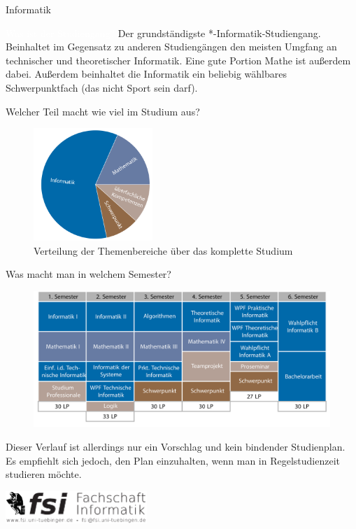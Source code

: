 	\begin{Huge}
			Informatik
		\end{Huge}
		\begin{exampleblock}{\textcolor{white}{Was ist der Studiengang?}}
			Der grundständigste *-Informatik-Studiengang. Beinhaltet im Gegensatz zu anderen Studiengängen den meisten Umgfang an technischer und theoretischer Informatik. Eine gute Portion Mathe ist außerdem dabei. Außerdem beinhaltet die Informatik ein beliebig wählbares Schwerpunktfach (das nicht Sport sein darf).
		\end{exampleblock}
	
	\begin{block}{Welcher Teil macht wie viel im Studium aus?}
		\begin{figure}[h!]
			\includegraphics[width=0.4\textwidth]{charts/informatik-Piechart.pdf}
			\caption{Verteilung der Themenbereiche über das komplette Studium}
		\end{figure}
	\end{block}
	
	\begin{block}{Was macht man in welchem Semester?}
		\begin{figure}[h!]
			\includegraphics[width=\textwidth]{charts/informatik-Studienplan_abWS18.pdf}
		\end{figure}
		Dieser Verlauf ist allerdings nur ein Vorschlag und kein bindender Studienplan. Es empfiehlt sich jedoch, den Plan einzuhalten, wenn man in Regelstudienzeit studieren möchte.
	\end{block}
\vfill
\begin{flushright}
	\includegraphics[width=0.4\textwidth]{fsilogo.pdf}
\end{flushright}
